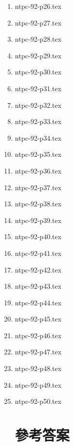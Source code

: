\documentclass[12pt,a4paper]{report}
\begin{document}
\begin{CJK}{UTF8}{bkai}
\begin{enumerate}
\item {ntpc-92-p26.tex}
\item {ntpc-92-p27.tex}
\item {ntpc-92-p28.tex}
\item {ntpc-92-p29.tex}
\item {ntpc-92-p30.tex}
\item {ntpc-92-p31.tex}
\item {ntpc-92-p32.tex}
\item {ntpc-92-p33.tex}
\item {ntpc-92-p34.tex}
\item {ntpc-92-p35.tex}
\item {ntpc-92-p36.tex}
\item {ntpc-92-p37.tex}
\item {ntpc-92-p38.tex}
\item {ntpc-92-p39.tex}
\item {ntpc-92-p40.tex}
\item {ntpc-92-p41.tex}
\item {ntpc-92-p42.tex}
\item {ntpc-92-p43.tex}
\item {ntpc-92-p44.tex}
\item {ntpc-92-p45.tex}
\item {ntpc-92-p46.tex}
\item {ntpc-92-p47.tex}
\item {ntpc-92-p48.tex}
\item {ntpc-92-p49.tex}
\item {ntpc-92-p50.tex}

\newpage

\section*{參考答案}


\end{enumerate}
\end{CJK}
\end{document}
